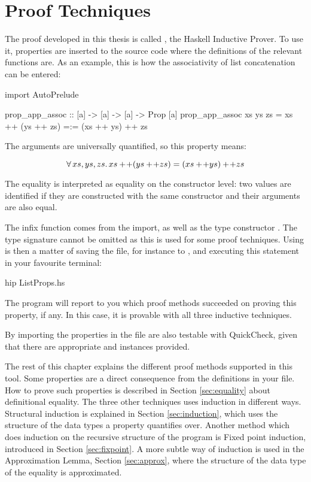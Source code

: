 \chapter{Proof Techniques}
\label{ch:proofs}

The proof developed in this thesis is called , the Haskell
Inductive Prover. To use it, properties are inserted to the source
code where the definitions of the relevant functions are. As an
example, this is how the associativity of list concatenation can be
entered:

\begin{code}
import AutoPrelude

prop_app_assoc :: [a] -> [a] -> [a] -> Prop [a]
prop_app_assoc xs ys zs = xs ++ (ys ++ zs) =:= (xs ++ ys) ++ zs
\end{code}

\noindent
The arguments are universally quantified, so this property means:

\newcommand\append{+\!+}
\begin{equation*}
  \faaa{xs}{ys}{zs} xs \append (ys \append zs) = (xs \append ys) \append zs
\end{equation*}

\noindent
The equality is interpreted as equality on the constructor level: two
values are identified if they are constructed with the same
constructor and their arguments are also equal.

The infix function \hs{=:=} comes from the import, as well as the type
constructor . The type signature cannot be omitted as this is
used for some proof techniques.  Using  is then a matter of
saving the file, for instance to , and executing this
statement in your favourite terminal:

\begin{code}
hip ListProps.hs
\end{code}

The program will report to you which proof methods succeeded on proving
this property, if any. In this case, it is provable with all three
inductive techniques.

By importing  the properties in the file are also
testable with QuickCheck, given that there are appropriate  and
 instances provided.

The rest of this chapter explains the different proof methods
supported in this tool. Some properties are a direct consequence from
the definitions in your file. How to prove such properties is
described in Section \ref{sec:equality} about definitional
equality. The three other techniques uses induction in different
ways. Structural induction is explained in Section
\ref{sec:induction}, which uses the structure of the data types a
property quantifies over. Another method which does induction on the
recursive structure of the program is Fixed point induction,
introduced in Section \ref{sec:fixpoint}. A more subtle way of
induction is used in the Approximation Lemma, Section
\ref{sec:approx}, where the structure of the data type of the equality
is approximated.

